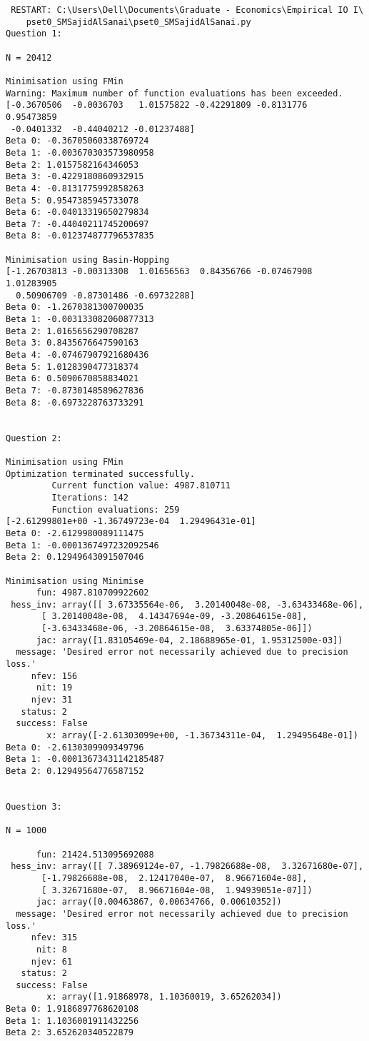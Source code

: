 \documentclass{article}
\begin{document}
\begin{lstlisting}
 RESTART: C:\Users\Dell\Documents\Graduate - Economics\Empirical IO I\
	pset0_SMSajidAlSanai\pset0_SMSajidAlSanai.py 
Question 1:

N = 20412

Minimisation using FMin
Warning: Maximum number of function evaluations has been exceeded.
[-0.3670506  -0.0036703   1.01575822 -0.42291809 -0.8131776   0.95473859
 -0.0401332  -0.44040212 -0.01237488]
Beta 0: -0.36705060338769724
Beta 1: -0.003670303573980958
Beta 2: 1.0157582164346053
Beta 3: -0.4229180860932915
Beta 4: -0.8131775992858263
Beta 5: 0.9547385945733078
Beta 6: -0.04013319650279834
Beta 7: -0.44040211745200697
Beta 8: -0.012374877796537835

Minimisation using Basin-Hopping
[-1.26703813 -0.00313308  1.01656563  0.84356766 -0.07467908  1.01283905
  0.50906709 -0.87301486 -0.69732288]
Beta 0: -1.2670381300700035
Beta 1: -0.003133082060877313
Beta 2: 1.0165656290708287
Beta 3: 0.8435676647590163
Beta 4: -0.07467907921680436
Beta 5: 1.0128390477318374
Beta 6: 0.5090670858834021
Beta 7: -0.8730148589627836
Beta 8: -0.6973228763733291


Question 2:

Minimisation using FMin
Optimization terminated successfully.
         Current function value: 4987.810711
         Iterations: 142
         Function evaluations: 259
[-2.61299801e+00 -1.36749723e-04  1.29496431e-01]
Beta 0: -2.6129980089111475
Beta 1: -0.0001367497232092546
Beta 2: 0.12949643091507046

Minimisation using Minimise
      fun: 4987.810709922602
 hess_inv: array([[ 3.67335564e-06,  3.20140048e-08, -3.63433468e-06],
       [ 3.20140048e-08,  4.14347694e-09, -3.20864615e-08],
       [-3.63433468e-06, -3.20864615e-08,  3.63374805e-06]])
      jac: array([1.83105469e-04, 2.18688965e-01, 1.95312500e-03])
  message: 'Desired error not necessarily achieved due to precision loss.'
     nfev: 156
      nit: 19
     njev: 31
   status: 2
  success: False
        x: array([-2.61303099e+00, -1.36734311e-04,  1.29495648e-01])
Beta 0: -2.6130309909349796
Beta 1: -0.00013673431142185487
Beta 2: 0.12949564776587152


Question 3:

N = 1000

      fun: 21424.513095692088
 hess_inv: array([[ 7.38969124e-07, -1.79826688e-08,  3.32671680e-07],
       [-1.79826688e-08,  2.12417040e-07,  8.96671604e-08],
       [ 3.32671680e-07,  8.96671604e-08,  1.94939051e-07]])
      jac: array([0.00463867, 0.00634766, 0.00610352])
  message: 'Desired error not necessarily achieved due to precision loss.'
     nfev: 315
      nit: 8
     njev: 61
   status: 2
  success: False
        x: array([1.91868978, 1.10360019, 3.65262034])
Beta 0: 1.9186897768620108
Beta 1: 1.1036001911432256
Beta 2: 3.652620340522879


\end{lstlisting}
\end{document}
